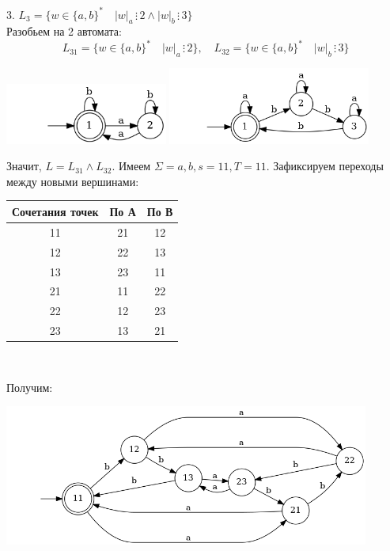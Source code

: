 \documentclass{article}
\begin{document}
    3. $L_3 = \{w \in \{a, b\}^* \quad |w|_a\, \vdots\, 2 \wedge |w|_b\, \vdots\, 3\}$\\
    Разобьем на 2 автомата:
    $$L_31 = \{w \in \{a, b\}^* \quad |w|_a\, \vdots\, 2\}, \quad L_32 = \{w \in \{a, b\}^* \quad |w|_b\, \vdots\, 3\}$$
    \begin{center}
        \includegraphics[width=0.4\textwidth]{pic13.dot}
        \includegraphics[width=0.5\textwidth]{pic14.dot}
    \end{center}
    Значит, $L = L_31 \wedge L_32$. Имеем $\Sigma = {a, b}, s = 11, T = 11$. Зафиксируем переходы между новыми вершинами:
    \begin{center}
        \begin{tabular}{|c|c|c|}
            \hline
            Сочетания точек & По А & По В \\
            \hline
            11 & 21 & 12\\
            12 & 22 & 13\\
            13 & 23 & 11\\
            21 & 11 & 22\\
            22 & 12 & 23\\
            23 & 13 & 21\\
            \hline
        \end{tabular}\\
    \end{center}
    Получим:
    \begin{center}
        \includegraphics[width=0.9\textwidth]{pic15.dot}
    \end{center}
    
\end{document}
